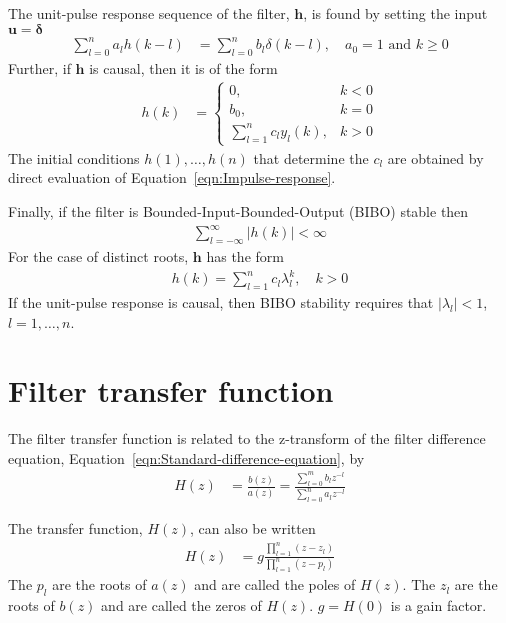 \documentclass[a4paper,twoside,10pt,english]{report}
\begin{document}
The unit-pulse response sequence of the filter, $\boldsymbol{h}$, is found by
setting the input $\boldsymbol{u}=\boldsymbol{\delta}$
\begin{align}
\sum^{n}_{l=0}a_{l}h\left(k-l\right) &= \sum^{n}_{l=0}b_{l}\delta\left(k-l\right),
\quad a_{0}=1\text{ and }k\ge 0
\label{eqn:Impulse-response}
\end{align}
Further, if $\boldsymbol{h}$ is causal, then it is of the form
\begin{align*}
h\left(k\right) &=
\begin{cases}
0, & k<0\\
b_{0}, & k=0\\
\sum^{n}_{l=1}c_{l}y_{l}\left(k\right), & k>0
\end{cases}
\end{align*}
The initial conditions $h\left(1\right),\hdots,h\left(n\right)$ that
determine the $c_{l}$ are obtained by direct evaluation of 
Equation~\ref{eqn:Impulse-response}. 

Finally, if the filter is Bounded-Input-Bounded-Output (BIBO) stable then
\begin{align*}
\sum^{\infty}_{l=-\infty}\left|h\left(k\right)\right| < \infty
\end{align*}
For the case of distinct roots, $\boldsymbol{h}$ has the form
\begin{align*}
h\left(k\right)=\sum^{n}_{l=1}c_{l}\lambda_{l}^{k}, \quad k > 0
\end{align*}
If the unit-pulse response is causal, then BIBO stability requires that
$\left|\lambda_{l}\right|<1$, $l=1,\hdots,n$.

\section{Filter transfer function}
The filter transfer function is related to the z-transform of the filter
difference equation, Equation~\ref{eqn:Standard-difference-equation}, by
\begin{align*}
H\left(z\right) &= \frac{b\left(z\right)}{a\left(z\right)}
                = \frac{\sum^{m}_{l=0}b_{l}z^{-l}}{\sum^{n}_{l=0}a_{l}z^{-l}}
\end{align*}
     
The transfer function, $H\left(z\right)$, can also be written
\begin{align*}
H\left(z\right)&= g\frac{\prod^{n}_{l=1}\left(z-z_{l}\right)}
                        {\prod^{n}_{l=1}\left(z-p_{l}\right)}
\end{align*}
The $p_{l}$ are the roots of $a\left(z\right)$ and are called the poles
of $H\left(z\right)$. The $z_{l}$ are the roots of $b\left(z\right)$
and are called the zeros of $H\left(z\right)$. $g=H\left(0\right)$ is a gain
factor.
\end{document}
